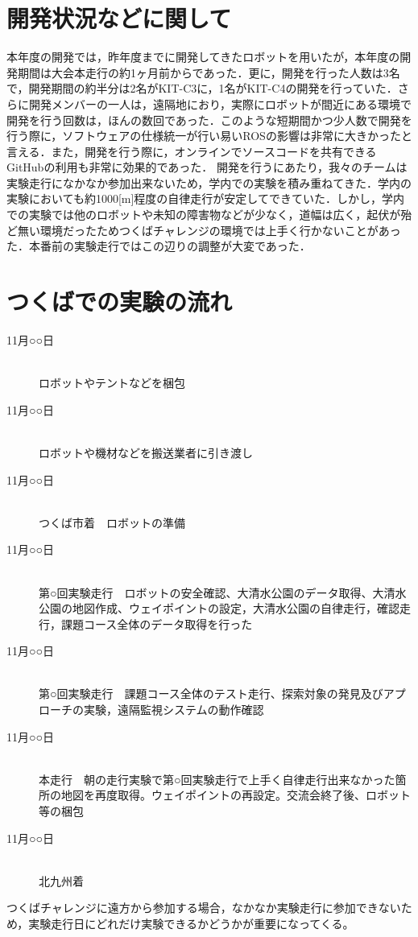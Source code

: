 \documentclass[10pt,a4paper]{jarticle}
\begin{document}
\section{開発状況などに関して}
本年度の開発では，昨年度までに開発してきたロボットを用いたが，本年度の開発期間は大会本走行の約1ヶ月前からであった．更に，開発を行った人数は3名で，開発期間の約半分は2名がKIT-C3に，1名がKIT-C4の開発を行っていた．さらに開発メンバーの一人は，遠隔地におり，実際にロボットが間近にある環境で開発を行う回数は，ほんの数回であった．このような短期間かつ少人数で開発を行う際に，ソフトウェアの仕様統一が行い易いROSの影響は非常に大きかったと言える．また，開発を行う際に，オンラインでソースコードを共有できるGitHubの利用も非常に効果的であった．
開発を行うにあたり，我々のチームは実験走行になかなか参加出来ないため，学内での実験を積み重ねてきた．学内の実験においても約1000[m]程度の自律走行が安定してできていた．しかし，学内での実験では他のロボットや未知の障害物などが少なく，道幅は広く，起伏が殆ど無い環境だったためつくばチャレンジの環境では上手く行かないことがあった．本番前の実験走行ではこの辺りの調整が大変であった．

\section{つくばでの実験の流れ}
\begin{description}
 \item[11月○○日]\mbox{}\\
	    ロボットやテントなどを梱包
 \item[11月○○日]\mbox{}\\
	    ロボットや機材などを搬送業者に引き渡し
 \item[11月○○日]\mbox{}\\
	    つくば市着　ロボットの準備
 \item[11月○○日]\mbox{}\\
	    第○回実験走行　ロボットの安全確認、大清水公園のデータ取得、大清水公園の地図作成、ウェイポイントの設定，大清水公園の自律走行，確認走行，課題コース全体のデータ取得を行った
 \item[11月○○日]\mbox{}\\
	    第○回実験走行　課題コース全体のテスト走行、探索対象の発見及びアプローチの実験，遠隔監視システムの動作確認
 \item[11月○○日]\mbox{}\\
	    本走行　朝の走行実験で第○回実験走行で上手く自律走行出来なかった箇所の地図を再度取得。ウェイポイントの再設定。交流会終了後、ロボット等の梱包
 \item[11月○○日]\mbox{}\\
	    北九州着
\end{description}
つくばチャレンジに遠方から参加する場合，なかなか実験走行に参加できないため，実験走行日にどれだけ実験できるかどうかが重要になってくる。
\end{document}
